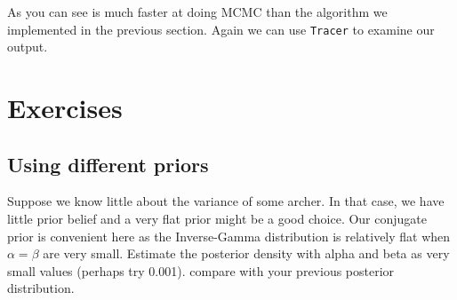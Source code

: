 As you can see \RevBayes is much faster at doing MCMC than the algorithm we implemented in the previous section. Again we can use {\tt Tracer} to examine our output. 


%
%

\bigskip

\section{Exercises}

\subsection{Using different priors}

Suppose we know little about the variance of some archer. In that case, we have little prior belief and a very flat prior might be a good choice. Our conjugate prior is convenient here as the Inverse-Gamma distribution is relatively flat when $\alpha = \beta$ are very small. Estimate the posterior density with alpha and beta as very small values (perhaps try 0.001). compare with your previous posterior distribution.

